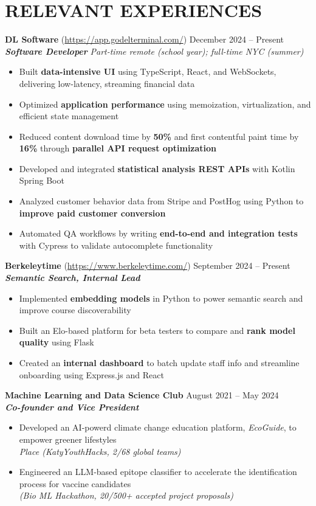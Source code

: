 \section*{RELEVANT EXPERIENCES}

\noindent
\textbf{DL Software} (\href{https://app.godelterminal.com/}{https://app.godelterminal.com/}) \hfill December 2024 -- Present \\
\textbf{\textit{Software Developer}} \hfill \textit{Part-time remote (school year); full-time NYC (summer)}
\begin{itemize}
	\item Built \textbf{data-intensive UI} using TypeScript, React, and WebSockets, delivering low-latency, streaming financial data
	\item Optimized \textbf{application performance} using memoization, virtualization, and efficient state management
	\item Reduced content download time by \textbf{50\%} and first contentful paint time by \textbf{16\%} through \textbf{parallel API request optimization}
	\item Developed and integrated \textbf{statistical analysis REST APIs} with Kotlin Spring Boot
	\item Analyzed customer behavior data from Stripe and PostHog using Python to \textbf{improve paid customer conversion}
	\item Automated QA workflows by writing \textbf{end-to-end and integration tests} with Cypress to validate autocomplete functionality
\end{itemize}

\noindent
\textbf{Berkeleytime} (\href{https://www.berkeleytime.com/}{https://www.berkeleytime.com/}) \hfill September 2024 -- Present \\
\textbf{\textit{Semantic Search, Internal Lead}}
\begin{itemize}
	\item Implemented \textbf{embedding models} in Python to power semantic search and improve course discoverability
	\item Built an Elo-based platform for beta testers to compare and \textbf{rank model quality} using Flask
	\item Created an \textbf{internal dashboard} to batch update staff info and streamline onboarding using Express.js and React
\end{itemize}

\noindent
\textbf{Machine Learning and Data Science Club} \hfill August 2021 -- May 2024 \\
\textbf{\textit{Co-founder and Vice President}}
\begin{itemize}
	\item Developed an AI-powerd climate change education platform, \textit{EcoGuide}, to empower greener lifestyles \\ \textit{ Place (KatyYouthHacks, 2/68 global teams)}
	\item Engineered an LLM-based epitope classifier to accelerate the identification process for vaccine candidates \\ \textit{(Bio ML Hackathon, 20/500+ accepted project proposals)}
\end{itemize}

